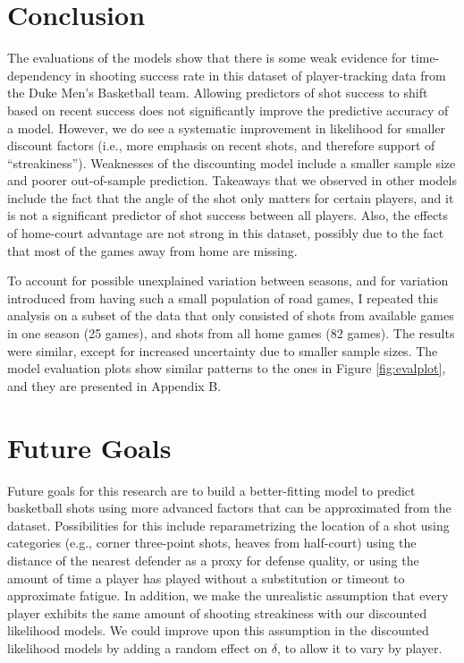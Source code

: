 \documentclass[12pt,twoside]{dukestatscithesis}
\theoremstyle{definition}
\theoremstyle{definition}
\theoremstyle{definition}
\theoremstyle{remark}
\begin{document}
\section{Conclusion}\label{conclusion}

The evaluations of the models show that there is some weak evidence for
time-dependency in shooting success rate in this dataset of
player-tracking data from the Duke Men's Basketball team. Allowing
predictors of shot success to shift based on recent success does not
significantly improve the predictive accuracy of a model. However, we do
see a systematic improvement in likelihood for smaller discount factors
(i.e., more emphasis on recent shots, and therefore support of
``streakiness''). Weaknesses of the discounting model include a smaller
sample size and poorer out-of-sample prediction. Takeaways that we
observed in other models include the fact that the angle of the shot
only matters for certain players, and it is not a significant predictor
of shot success between all players. Also, the effects of home-court
advantage are not strong in this dataset, possibly due to the fact that
most of the games away from home are missing.

To account for possible unexplained variation between seasons, and for
variation introduced from having such a small population of road games,
I repeated this analysis on a subset of the data that only consisted of
shots from available games in one season (25 games), and shots from all
home games (82 games). The results were similar, except for increased
uncertainty due to smaller sample sizes. The model evaluation plots show
similar patterns to the ones in Figure \ref{fig:evalplot}, and they are
presented in Appendix B.

\section{Future Goals}\label{future-goals}

Future goals for this research are to build a better-fitting model to
predict basketball shots using more advanced factors that can be
approximated from the dataset. Possibilities for this include
reparametrizing the location of a shot using categories (e.g., corner
three-point shots, heaves from half-court) using the distance of the
nearest defender as a proxy for defense quality, or using the amount of
time a player has played without a substitution or timeout to
approximate fatigue. In addition, we make the unrealistic assumption
that every player exhibits the same amount of shooting streakiness with
our discounted likelihood models. We could improve upon this assumption
in the discounted likelihood models by adding a random effect on
\(\delta\), to allow it to vary by player.
\end{document}
